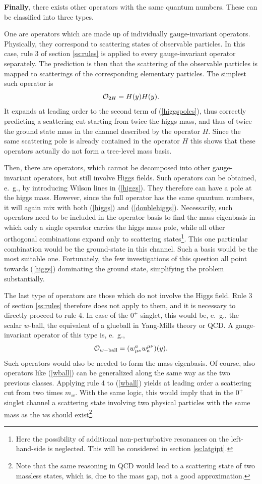 \documentclass[final,twoside,12pt]{article}
\newcommand*{\no}{\noindent}
\newcommand*{\be}{\begin{equation}}
\newcommand*{\ee}{\end{equation}}
\newcommand*{\pref}[1]{(\ref{#1})}
\newcommand*{\mn}{{\mu\nu}}
\newcommand*{\1}{1\!\!\!\bot}
\newcommand*{\op}{{\cal O}}
\begin{document}
{\bf Finally}, there exists other operators with the same quantum numbers. These can be classified into three types.

One are operators which are made up of individually gauge-invariant operators. Physically, they correspond to scattering states of observable particles. In this case, rule 3 of section \ref{ss:rules} is applied to every gauge-invariant operator separately. The prediction is then that the scattering of the observable particles is mapped to scatterings of the corresponding elementary particles. The simplest such operator is
\be
{\cal O}_{2H}=H(y)H(y)\label{doublehiggs}.
\ee
\no It expands at leading order to the second term of \pref{higgspoles}, thus correctly predicting a scattering cut starting from twice the higgs mass, and thus of twice the ground state mass in the channel described by the operator $H$. Since the same scattering pole is already contained in the operator $H$ this shows that these operators actually do not form a tree-level mass basis.

Then, there are operators, which cannot be decomposed into other gauge-invariant operators, but still involve Higgs fields. Such operators can be obtained, e.\ g., by introducing Wilson lines in \pref{higgs}. They therefore can have a pole at the higgs mass. However, since the full operator has the same quantum numbers, it will again mix with both \pref{higgs} and \pref{doublehiggs}. Necessarily, such operators need to be included in the operator basis to find the mass eigenbasis in which only a single operator carries the higgs mass pole, while all other orthogonal combinations expand only to scattering states\footnote{Here the possibility of additional non-perturbative resonances on the left-hand-side is neglected. This will be considered in section \ref{ss:latgipt}.}. This one particular combination would be the ground-state in this channel. Such a basis would be the most suitable one. Fortunately, the few investigations of this question \cite{Maas:2013aia,Maas:2014pba,Wurtz:2013ova} all point towards \pref{higgs} dominating the ground state, simplifying the problem substantially.

The last type of operators are those which do not involve the Higgs field. Rule 3 of section \ref{ss:rules} therefore does not apply to them, and it is necessary to directly proceed to rule 4. In case of the $0^{+}$ singlet, this would be, e.\ g., the scalar $w$-ball, the equivalent of a glueball in Yang-Mills theory or QCD. A gauge-invariant operator of this type is, e.\ g.,
\be
\op_{w\mathrm{-ball}}=(w_\mn^a w^\mn_a)(y)\label{wball}.
\ee
\no Such operators would also be needed to form the mass eigenbasis. Of course, also operators like \pref{wball} can be generalized along the same way as the two previous classes. Applying rule 4 to \pref{wball} yields at leading order a scattering cut from two times $m_w$. With the same logic, this would imply that in the $0^+$ singlet channel a scattering state involving two physical particles with the same mass as the $w$s should exist\footnote{Note that the same reasoning in QCD would lead to a scattering state of two massless states, which is, due to the mass gap, not a good approximation.}.
\end{document}
